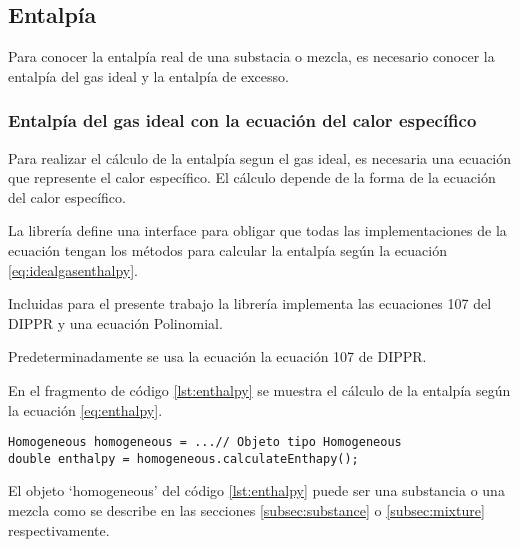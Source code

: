 \subsection{Entalpía}\label{subsec:enthalpy}

	Para conocer la entalpía real de una substacia o mezcla, es necesario conocer la entalpía del gas ideal y la entalpía de excesso.

\subsubsection{Entalpía del gas ideal con la ecuación del calor específico}
	Para realizar el cálculo de la entalpía segun el gas ideal, es necesaria una ecuación que represente el calor específico. El cálculo depende de la forma de la ecuación del calor específico.

	La librería \Materia  define una interface para obligar que todas las implementaciones de la ecuación tengan los métodos para calcular la entalpía según la ecuación \ref{eq:idealgasenthalpy}.

	Incluidas para el presente trabajo la librería \Materia implementa las ecuaciones 107 del DIPPR y una ecuación Polinomial. 
	
	Predeterminadamente se usa la ecuación la ecuación 107 de DIPPR.

	En el fragmento de código \ref{lst:enthalpy} se muestra el cálculo de la entalpía según la ecuación \ref{eq:enthalpy}. 

\begin{lstlisting}[caption={Cálculo de la entalpía},label={lst:enthalpy}]
Homogeneous homogeneous = ...// Objeto tipo Homogeneous
double enthalpy = homogeneous.calculateEnthapy();
\end{lstlisting}
	
	El objeto `homogeneous' del código \ref{lst:enthalpy} puede ser una substancia o una mezcla como se describe en las secciones \ref{subsec:substance} o \ref{subsec:mixture} respectivamente.

\begin{figure}[!h]
	\centering	
	\caption{}\label{fig:2denthalpy}
\end{figure}


